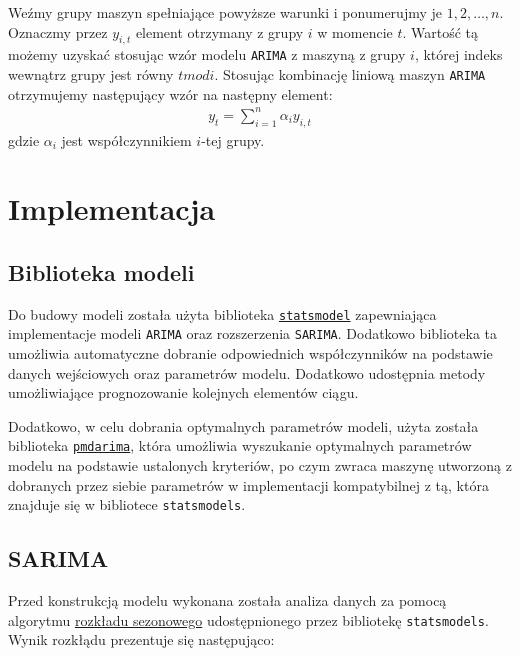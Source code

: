 \documentclass[12pt]{article}
\begin{document}
Weźmy grupy maszyn spełniające powyższe warunki i ponumerujmy je $1, 2, \dots, n$. Oznaczmy przez $y_{i,t}$ element otrzymany z grupy $i$ w momencie $t$. Wartość tą możemy uzyskać stosując wzór modelu \texttt{ARIMA} z maszyną z grupy $i$, której indeks wewnątrz grupy jest równy $t mod i$.
Stosując kombinację liniową maszyn \texttt{ARIMA} otrzymujemy następujący wzór na następny element:
\begin{gather*}
    y_t = \sum^n_{i=1}\alpha_iy_{i,t}
\end{gather*}
gdzie $\alpha_i$ jest współczynnikiem $i$-tej grupy.

\section{Implementacja}

\subsection{Biblioteka modeli}

Do budowy modeli została użyta biblioteka \href{https://www.statsmodels.org/stable/index.html}{\texttt{statsmodel}} zapewniająca implementacje modeli \texttt{ARIMA} oraz rozszerzenia \texttt{SARIMA}. Dodatkowo biblioteka ta umożliwia automatyczne dobranie odpowiednich współczynników na podstawie danych wejściowych oraz parametrów modelu. Dodatkowo udostępnia metody umożliwiające prognozowanie kolejnych elementów ciągu.

Dodatkowo, w celu dobrania optymalnych parametrów modeli, użyta została biblioteka \href{https://alkaline-ml.com/pmdarima/}{\texttt{pmdarima}}, która umożliwia wyszukanie optymalnych parametrów modelu na podstawie ustalonych kryteriów, po czym zwraca maszynę utworzoną z dobranych przez siebie parametrów w implementacji kompatybilnej z tą, która znajduje się w bibliotece \texttt{statsmodels}.

\subsection{SARIMA}

Przed konstrukcją modelu wykonana została analiza danych za pomocą algorytmu \href{https://www.statsmodels.org/stable/generated/statsmodels.tsa.seasonal.seasonal_decompose.html}{rozkładu sezonowego} udostępnionego przez bibliotekę \texttt{statsmodels}. Wynik rozkłądu prezentuje się następująco:
\end{document}

